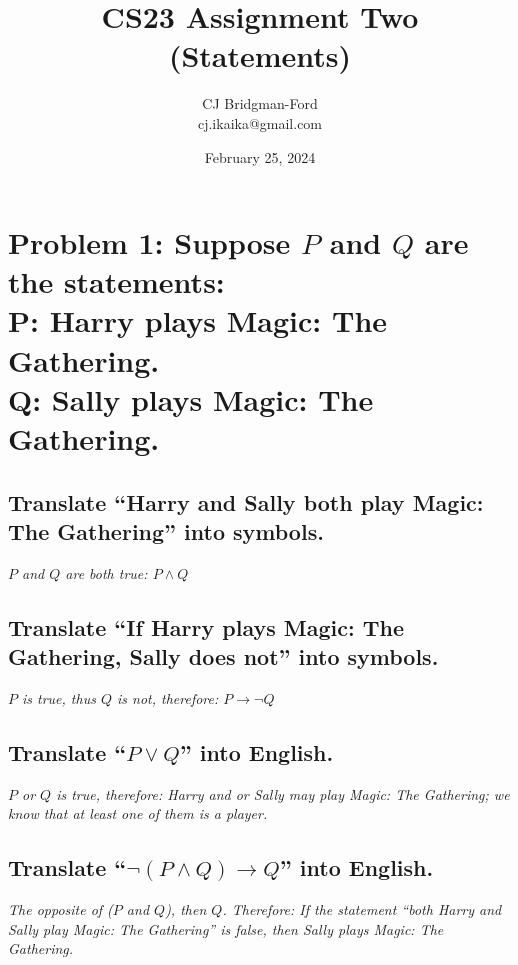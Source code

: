 \documentclass{article}
\title{CS23 Assignment Two (Statements)}
\author{CJ Bridgman-Ford \\ cj.ikaika@gmail.com}
\date{February 25, 2024}
\begin{document}
\maketitle
\thispagestyle{empty}


\clearpage



\section{Problem 1: Suppose $P$ and $Q$ are the statements: \\ P: Harry plays Magic: The Gathering. \\ Q: Sally plays Magic: The Gathering.}
\subsection{Translate ``Harry and Sally both play Magic: The Gathering'' into symbols.}
\hspace{1cm}\textit{$P$ and $Q$ are both true: $P \land Q$}
\subsection{Translate ``If Harry plays Magic: The Gathering, Sally does not'' into symbols.}
\hspace{1cm}\textit{$P$ is true, thus $Q$ is not, therefore: $P \xrightarrow{}\neg Q$}
\subsection{Translate ``$P\lor Q$'' into English.}
\hspace{1cm}\textit{$P$ or $Q$ is true, therefore: Harry and or Sally may play Magic: The Gathering; we know that at least one of them is a player.} 
\subsection{Translate ``$\neg (P \land Q) \xrightarrow{} Q$'' into English.}
\hspace{1cm}\textit{The opposite of ($P$ and $Q$), then $Q$. Therefore: If the statement   ``both Harry and Sally play Magic: The Gathering'' is false, then Sally plays Magic: The Gathering.}

\end{document}
